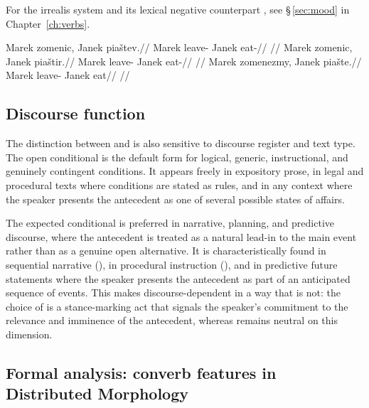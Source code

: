 For the irrealis system and its lexical negative counterpart ,
see §\,\ref{sec:mood} in Chapter~\ref{ch:verbs}.

\pex \label{ex:cond-irr}
\a
\begingl
\gla Marek zomenic, Janek piaštev.//
\glb Marek leave-\Cond{} Janek eat-\Irr{}//
\glft {} //
\endgl
\a
\begingl
\gla Marek zomenic, Janek piaštir.//
\glb Marek leave-\Cond{} Janek eat-\NIrr{}//
\glft {} //
\endgl
\a
\begingl
\gla Marek zomenezmy, Janek piašte.//
\glb Marek leave-\ECond{} Janek eat//
\glft {} //
\endgl
\xe

\subsection{Discourse function}\label{sec:cond-discourse}

The distinction between  and  is also sensitive to
discourse register and text type. The open conditional  is the
default form for logical, generic, instructional, and genuinely
contingent conditions. It appears freely in expository prose, in legal
and procedural texts where conditions are stated as rules, and in any
context where the speaker presents the antecedent as one of several
possible states of affairs.

The expected conditional  is preferred in narrative, planning,
and predictive discourse, where the antecedent is treated as a natural
lead-in to the main event rather than as a genuine open alternative. It
is characteristically found in sequential narrative (), in procedural instruction (), and in predictive future statements where the
speaker presents the antecedent as part of an anticipated sequence of
events. This makes  discourse-dependent in a way that
 is not: the choice of  is a stance-marking act that
signals the speaker's commitment to the relevance and imminence of the
antecedent, whereas  remains neutral on this dimension.

\subsection{Formal analysis: converb features in Distributed Morphology}\label{sec:cond-dm}

